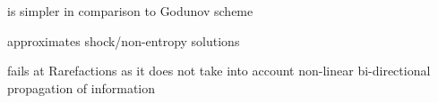 \begin{sectionbox}\nospacing
    \begin{minipage}{0.45\textwidth}
       \begin{proslist}
           \item is simpler in comparison to Godunov scheme
           \item approximates shock/non-entropy solutions
       \end{proslist} 
    \end{minipage}\hfil
    \begin{minipage}{0.5\textwidth}
       \begin{conslist}
           \item fails at Rarefactions as it does not take into account non-linear bi-directional propagation of information
       \end{conslist} 
    \end{minipage}
\end{sectionbox}



